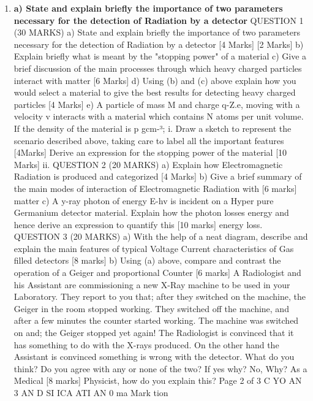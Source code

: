 \documentclass[12pt]{article}  %
\begin{document}
\begin{enumerate}
\item \textbf{a)
State and explain briefly the importance of two parameters necessary for the detection of
Radiation by a detector}
QUESTION 1 (30 MARKS)
a)
State and explain briefly the importance of two parameters necessary for the detection of
Radiation by a detector
[4 Marks]
[2 Marks]
b) Explain briefly what is meant by the "stopping power" of a material
c) Give a brief discussion of the main processes through which heavy charged particles interact
with matter
[6 Marks]
d) Using (b) and (c) above explain how you would select a material to give the best results for
detecting heavy charged particles
[4 Marks]
e) A particle of mass M and charge q-Z.e, moving with a velocity v interacts with a material
which contains N atoms per unit volume. If the density of the material is p gcm-³;
i.
Draw a sketch to represent the scenario described above, taking care to label all the
important features
[4Marks]
Derive an expression for the stopping power of the material
[10 Marks]
ii.
QUESTION 2 (20 MARKS)
a) Explain how Electromagnetic Radiation is produced and categorized
[4 Marks]
b) Give a brief summary of the main modes of interaction of Electromagnetic Radiation with
[6 marks]
matter
c) A y-ray photon of energy E-hv is incident on a Hyper pure Germanium detector material.
Explain how the photon losses energy and hence derive an expression to quantify this
[10 marks]
energy loss.
QUESTION 3 (20 MARKS)
a)
With the help of a neat diagram, describe and explain the main features of typical Voltage
Current characteristics of Gas filled detectors
[8 marks]
b) Using (a) above, compare and contrast the operation of a Geiger and proportional Counter
[6 marks]
A Radiologist and his Assistant are commissioning a new X-Ray machine to be used in
your Laboratory. They report to you that; after they switched on the machine, the Geiger in
the room stopped working. They switched off the machine, and after a few minutes the
counter started working. The machine was switched on and; the Geiger stopped yet again!
The Radiologist is convinced that it has something to do with the X-rays produced. On the
other hand the Assistant is convinced something is wrong with the detector. What do you
think? Do you agree with any or none of the two? If yes why? No, Why? As a Medical
[8 marks]
Physicist, how do you explain this?
Page 2 of 3
C
YO
AN
3 AN
D SI
ICA
ATI
AN
0 ma
Mark
tion


\end{enumerate}
\end{document}
